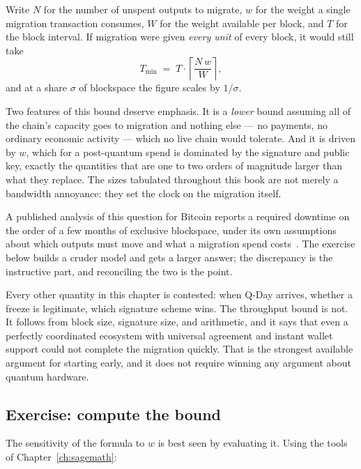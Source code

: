Write $N$ for the number of unspent outputs to migrate, $w$ for the weight a
single migration transaction consumes, $W$ for the weight available per block,
and $T$ for the block interval. If migration were given \emph{every unit} of
every block, it would still take
\[
  T_{\min} \;=\; T \cdot \left\lceil \frac{N\,w}{W} \right\rceil ,
\]
and at a share $\sigma$ of blockspace the figure scales by $1/\sigma$.

Two features of this bound deserve emphasis. It is a \emph{lower} bound assuming
all of the chain's capacity goes to migration and nothing else --- no payments,
no ordinary economic activity --- which no live chain would tolerate. And it is
driven by $w$, which for a post-quantum spend is dominated by the signature and
public key, exactly the quantities that are one to two orders of magnitude larger
than what they replace. The sizes tabulated throughout this book are not merely a
bandwidth annoyance: they set the clock on the migration itself.

A published analysis of this question for Bitcoin reports a required downtime on
the order of a few months of exclusive blockspace, under its own assumptions
about which outputs must move and what a migration spend
costs~\cite{pont2024}. The exercise below builds a cruder model and gets a
larger answer; the discrepancy is the instructive part, and reconciling the two
is the point.

\begin{remark}
Every other quantity in this chapter is contested: when Q-Day arrives, whether a
freeze is legitimate, which signature scheme wins. The throughput bound is not.
It follows from block size, signature size, and arithmetic, and it says that even
a perfectly coordinated ecosystem with universal agreement and instant wallet
support could not complete the migration quickly. That is the strongest available
argument for starting early, and it does not require winning any argument about
quantum hardware.
\end{remark}

\subsection*{Exercise: compute the bound}

The sensitivity of the formula to $w$ is best seen by evaluating it. Using the tools of Chapter~\ref{ch:sagemath}:

